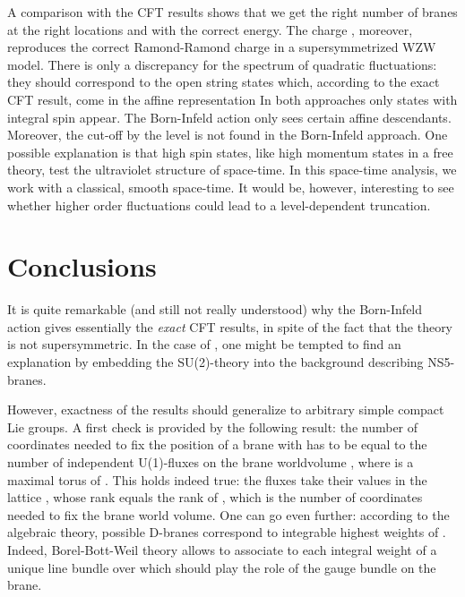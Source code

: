 \documentclass[a4paper,12pt]{article} \usepackage{amssymb,amsfonts,latexsym}
\begin{document}
A comparison with the CFT results shows that we get the right number of
branes at the right locations and with the correct energy. The charge \coordHE{},
moreover, reproduces the correct Ramond-Ramond charge in a supersymmetrized
WZW model.  There is only a discrepancy for the spectrum of quadratic 
fluctuations: they should correspond to the open string states which, according
to the exact CFT result, come in the affine representation
\coordHE{}
In both approaches only states with integral spin appear. The Born-Infeld
action only sees certain affine descendants. Moreover, the cut-off
by the level \coordHE{} is not found in the Born-Infeld approach. One possible
explanation is that high spin states, like high momentum states in a free
theory, test the ultraviolet structure of space-time. In this space-time
analysis, we work with a classical, smooth space-time. It would be, however, 
interesting to see whether higher order fluctuations could lead to a 
level-dependent truncation.

\section{Conclusions}

It is quite remarkable (and still not really understood) why the Born-Infeld 
action gives essentially the {\em exact} CFT results, in spite of the fact 
that the theory is not
supersymmetric. In the case of \coordHE{}, one might be tempted to find an
explanation by embedding the SU(2)-theory into the background describing
\coordHE{} NS5-branes. 

However, exactness of the results should generalize to arbitrary simple 
compact Lie groups. A first check is provided by the following result: the 
number of coordinates needed to fix the position of a brane with \coordHE{} has
to be equal to the number of independent U(1)-fluxes on the brane worldvolume
\coordHE{}, where \coordHE{} is a maximal torus of \coordHE{}. This holds indeed true: the fluxes 
take their values in the lattice \coordHE{}, whose rank equals the rank 
of \coordHE{}, which is the number of coordinates needed to fix the brane world 
volume. One can go even further: according to the algebraic theory, possible 
D-branes correspond to integrable highest weights of \coordHE{}. Indeed, 
Borel-Bott-Weil 
theory allows to associate to each integral weight of \coordHE{} a unique line bundle 
over \coordHE{} which should play the role of the gauge bundle on the brane.
\end{document}
